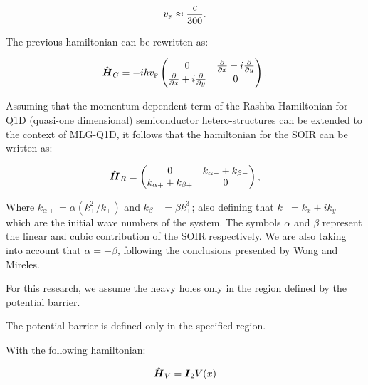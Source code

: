 \begin{equation}
    \label{eq:vF}
    v_{\mbox{\tiny F}} \approx \frac{c}{300}.
\end{equation}

The previous hamiltonian can be rewritten as:

\begin{equation}
    \label{eq:pristineGrapheneMatrix}
    \hat{\mbox{\boldmath $H$}}_G = -i\hbar v_{\mbox{\tiny F}}
    \begin{pmatrix}
        0                                                         & \frac{\partial}{\partial x}- i\frac{\partial}{\partial y} \\
        \frac{\partial}{\partial x}+ i\frac{\partial}{\partial y} & 0
    \end{pmatrix}.
\end{equation}

Assuming that the momentum-dependent term of the Rashba Hamiltonian for Q1D (quasi-one dimensional) semiconductor hetero-structures can be extended to the context of MLG-Q1D\cite{RDiago2010, Serna2019, RCDiagoEPL2015}, it follows that the hamiltonian for the SOIR can be written as:

\begin{equation}
    \label{eq:SOIRHamiltonian}
    \hat{\mbox{\boldmath $H$}}_R =
    \begin{pmatrix}
        0                        & k_{\alpha-} + k_{\beta-} \\
        k_{\alpha+} + k_{\beta+} & 0
    \end{pmatrix},
\end{equation}

\noindent Where $k_{\alpha\pm} = \alpha\left(k_{\pm}^2/k_{\mp}\right)$ and $k_{\beta\pm} = \beta k_{\pm}^3$; also defining that $k_{\pm}=k_x\pm i k_y$ which are the initial wave numbers of the system.
The symbols $\alpha$ and $\beta$ represent the linear and cubic contribution of the SOIR respectively.
We are also taking into account that $\alpha = -\beta$, following the conclusions presented by Wong and Mireles\cite{WongUNAM2005}.

For this research, we assume the heavy holes only in the region defined by the potential barrier.

The potential barrier is defined only in the specified region.


With the following hamiltonian:

\begin{equation}
    \label{eq:potentialBarrierHamiltonian}
    \hat{\mbox{\boldmath $H$}}_V=\mbox{\boldmath $I$}_2 V(x)
\end{equation}

